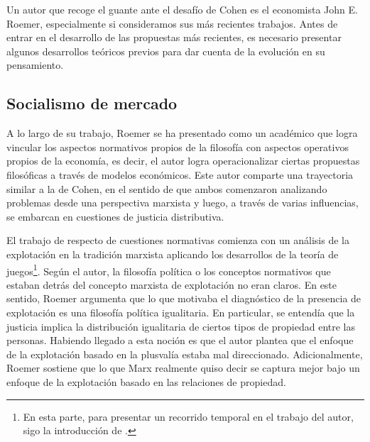 Un autor que recoge el guante ante el desafío de Cohen es el economista John E. Roemer, especialmente si consideramos sus más recientes trabajos. Antes de entrar en el desarrollo de las propuestas más recientes, es necesario presentar algunos desarrollos teóricos previos para dar cuenta de la evolución en su pensamiento.

\subsection{Socialismo de mercado}

A lo largo de su trabajo, Roemer se ha presentado como un académico que logra vincular los aspectos normativos propios de la filosofía con aspectos operativos propios de la economía, es decir, el autor logra operacionalizar ciertas propuestas filosóficas a través de modelos económicos. Este autor comparte una trayectoria similar a la de Cohen, en el sentido de que ambos comenzaron analizando problemas desde una perspectiva marxista y luego, a través de varias influencias, se embarcan en cuestiones de justicia distributiva.

El trabajo de \citet{Roemer_1982} respecto de cuestiones normativas comienza con un análisis de la explotación en la tradición marxista aplicando los desarrollos de la teoría de juegos\footnote{En esta parte, para presentar un recorrido temporal en el trabajo del autor, sigo la introducción de \citet{Roemer_1996b}.}. Según el autor, la filosofía política o los conceptos normativos que estaban detrás del concepto marxista de explotación no eran claros. En este sentido, Roemer argumenta que lo que motivaba el diagnóstico de la presencia de explotación es una filosofía política igualitaria. En particular, se entendía que la justicia implica la distribución igualitaria de ciertos tipos de propiedad entre las personas. Habiendo llegado a esta noción es que el autor plantea que el enfoque de la explotación basado en la plusvalía estaba mal direccionado. Adicionalmente, Roemer sostiene que lo que Marx realmente quiso decir se captura mejor bajo un enfoque de la explotación basado en las relaciones de propiedad. 



